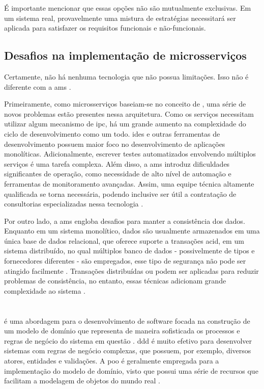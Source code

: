 É importante mencionar que essas opções não são mutualmente exclusivas. Em um sistema real, provavelmente uma mistura de estratégias necessitará ser aplicada para satisfazer os requisitos funcionais e não-funcionais.

\subsection{Desafios na implementação de microsserviços}
Certamente, não há nenhuma tecnologia que não possua limitações. Isso não é diferente com a \acrlong{ams} \cite{richardson2018microservices}. 

Primeiramente, como microsserviços baseiam-se no conceito de , uma série de novos problemas estão presentes nessa arquitetura. Como os serviços necessitam utilizar algum mecanismo de \acrshort{ipc}, há um grande aumento na complexidade do ciclo de desenvolvimento como um todo. \acrshort{ide}s e outras ferramentas de desenvolvimento possuem maior foco no desenvolvimento de aplicações monolíticas. Adicionalmente, escrever testes automatizados envolvendo múltiplos serviços é uma tarefa complexa. Além disso, a \acrshort{ams} introduz dificuldades significantes de operação, como necessidade de alto nível de automação e ferramentas de monitoramento avançadas. Assim, uma equipe técnica altamente qualificada se torna necessária, podendo inclusive ser útil a contratação de consultorias especializadas nessa tecnologia \cite{richardson2018microservices}.

Por outro lado, a \acrfull{ams} engloba desafios para manter a consistência dos dados. Enquanto em um sistema monolítico, dados são usualmente armazenados em uma única base de dados relacional, que oferece suporte a transações \acrshort{acid}, em um sistema distribuído, no qual múltiplos banco de dados - possivelmente de tipos e fornecedores diferentes - são empregados, esse tipo de segurança não pode ser atingido facilmente \cite{buildingMicroservices}. Transações distribuídas ou  podem ser aplicadas para reduzir problemas de consistência, no entanto, essas técnicas adicionam grande complexidade ao sistema \cite{buildingMicroservices}.

\section{} 
 é uma abordagem para o desenvolvimento de software focada na construção de um modelo de domínio que representa de maneira sofisticada os processos e regras de negócio do sistema em questão \cite{dddFowler}. \acrshort{ddd} é muito efetivo para desenvolver sistemas com regras de negócio complexas, que possuem, por exemplo, diversos atores, entidades e validações. A \acrfull{poo} é geralmente empregada para a implementação do modelo de domínio, visto que possui uma série de recursos que facilitam a modelagem de objetos do mundo real \cite{evans2004ddd}.

